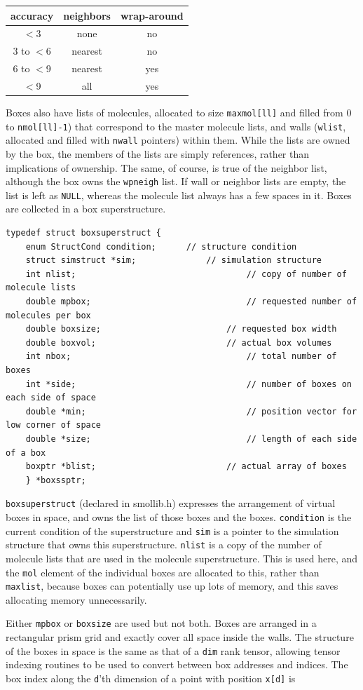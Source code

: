 \documentclass {scrbook}
\newcommand {\ttt} {\texttt}
\begin{document}
\begin{longtable}[c]{ccc}
accuracy&neighbors&wrap-around\\
\hline
$<$3&none&no\\
3 to $<$6&nearest&no\\
6 to $<$9&nearest&yes\\
$<$9&all&yes\\
\end{longtable}

Boxes also have lists of molecules, allocated to size \ttt{maxmol[ll]} and filled from 0 to \ttt{nmol[ll]-1}) that correspond to the master molecule lists, and walls (\ttt{wlist}, allocated and filled with \ttt{nwall} pointers) within them. While the lists are owned by the box, the members of the lists are simply references, rather than implications of ownership. The same, of course, is true of the neighbor list, although the box owns the \ttt{wpneigh} list. If wall or neighbor lists are empty, the list is left as \ttt{NULL}, whereas the molecule list always has a few spaces in it.
Boxes are collected in a box superstructure.

\begin{lstlisting}
typedef struct boxsuperstruct {
	enum StructCond condition;		// structure condition
	struct simstruct *sim;				// simulation structure
	int nlist;									// copy of number of molecule lists
	double mpbox;								// requested number of molecules per box
	double boxsize;							// requested box width
	double boxvol;							// actual box volumes
	int nbox;									// total number of boxes
	int *side;									// number of boxes on each side of space
	double *min;								// position vector for low corner of space
	double *size;								// length of each side of a box
	boxptr *blist; 							// actual array of boxes
	} *boxssptr;
\end{lstlisting}

\ttt{boxsuperstruct} (declared in smollib.h) expresses the arrangement of virtual boxes in space, and owns the list of those boxes and the boxes. \ttt{condition} is the current condition of the superstructure and \ttt{sim} is a pointer to the simulation structure that owns this superstructure. \ttt{nlist} is a copy of the number of molecule lists that are used in the molecule superstructure. This is used here, and the \ttt{mol} element of the individual boxes are allocated to this, rather than \ttt{maxlist}, because boxes can potentially use up lots of memory, and this saves allocating memory unnecessarily.

Either \ttt{mpbox} or \ttt{boxsize} are used but not both. Boxes are arranged in a rectangular prism grid and exactly cover all space inside the walls. The structure of the boxes in space is the same as that of a \ttt{dim} rank tensor, allowing tensor indexing routines to be used to convert between box addresses and indices. The box index along the \ttt{d}'th dimension of a point with position \ttt{x[d]} is
\end{document}
